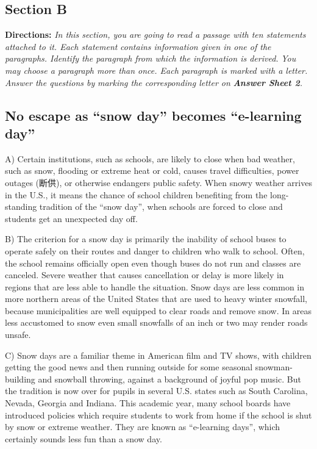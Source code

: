 \documentclass[UTF8,11pt]{ctexart}
\begin{document}
\subsection*{\textbf{Section B}}


\textbf{Directions:} \textit{In this section, you are going to read a passage with ten statements attached to it. Each statement} \textit{contains information given in one of the paragraphs. Identify the paragraph from which the information is derived.} \textit{You may choose a paragraph more than once. Each paragraph is marked with a letter. Answer the questions by} \textit{marking the corresponding letter on }\textbf{\textit{Answer Sheet 2}}\textit{.}


\subsection*{\textbf{No escape as “snow day” becomes “e-learning day”}}


A) Certain institutions, such as schools, are likely to close when bad weather, such as snow, flooding or extreme heat or cold, causes travel difficulties, power outages (断供), or otherwise endangers public safety. When snowy weather arrives in the U.S., it means the chance of school children benefiting from the long-standing tradition of the “snow day”, when schools are forced to close and students get an unexpected day off.


B) The criterion for a snow day is primarily the inability of school buses to operate safely on their routes and danger to children who walk to school. Often, the school remains officially open even though buses do not run and classes are canceled. Severe weather that causes cancellation or delay is more likely in regions that are less able to handle the situation. Snow days are less common in more northern areas of the United States that are used to heavy winter snowfall, because municipalities are well equipped to clear roads and remove snow. In areas less accustomed to snow even small snowfalls of an inch or two may render roads unsafe.


C) Snow days are a familiar theme in American film and TV shows, with children getting the good news and then running outside for some seasonal snowman-building and snowball throwing, against a background of joyful pop music. But the tradition is now over for pupils in several U.S. states such as South Carolina, Nevada, Georgia and Indiana. This academic year, many school boards have introduced policies which require students to work from home if the school is shut by snow or extreme weather. They are known as “e-learning days”, which certainly sounds less fun than a snow day.
\end{document}
